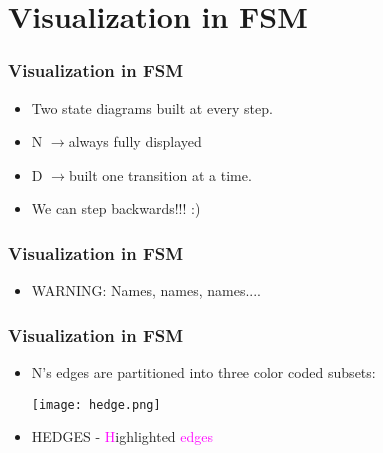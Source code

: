 \documentclass{beamer}
\newcommand{\arrow}{\(\rightarrow\)}
\begin{document}
\section{Visualization in FSM}

\begin{frame}[fragile]
\frametitle{Visualization in FSM}
\begin{scriptsize}
\begin{itemize}
\normalsize
\item<1-> Two state diagrams built at every step.
\item<2->   N \arrow always fully displayed
\item<3->  D \arrow built one transition at a time.
\item<4-> We can step backwards!!! :)

\end{itemize}
\end{scriptsize}
\end{frame}


\begin{frame}[fragile]
\frametitle{Visualization in FSM}
\begin{scriptsize}
\begin{itemize}
\normalsize
\item<1-> WARNING: Names, names, names....

\end{itemize}
\end{scriptsize}
\end{frame}

\begin{frame}[fragile]
\frametitle{Visualization in FSM}
\begin{scriptsize}
\begin{itemize}
\normalsize
\item<1-> N's edges are partitioned into three color coded subsets: \newline

\begin{center}
\texttt{[image: hedge.png]}
\end{center}

\item<1-> HEDGES - \textcolor{magenta}{H}ighlighted \textcolor{magenta}{edges}

\end{itemize}
\end{scriptsize}
\end{frame}
\end{document}
